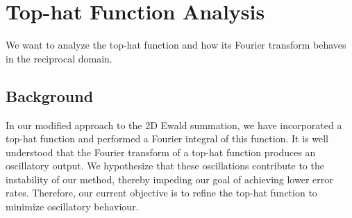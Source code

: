 \clearpage
\section{Top-hat Function Analysis}
We want to analyze the top-hat function and how its Fourier transform behaves in the reciprocal domain.

\subsection*{Background}
In our modified approach to the 2D Ewald summation, we have incorporated a top-hat function and performed a Fourier integral of this function. It is well understood that the Fourier transform of a top-hat function produces an oscillatory output. We hypothesize that these oscillations contribute to the instability of our method, thereby impeding our goal of achieving lower error rates. Therefore, our current objective is to refine the top-hat function to minimize oscillatory behaviour.
